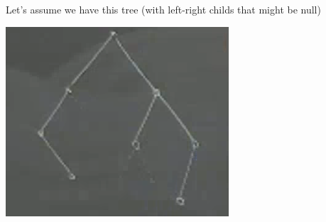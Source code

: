 \documentclass[10pt]{report}
\begin{document}
Let's assume we have this tree (with left-right childs that might be null)
\begin{center}
	\includegraphics[scale=0.5]{14.png}
\end{center}
\end{document}
